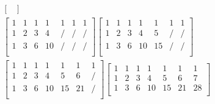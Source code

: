 \begin{gather*}
\begin{bmatrix}
	\end{bmatrix}
	\\
	\begin{bmatrix}
		1 & 1 & 1 & 1  & 1 & 1 & 1 \\
		1 & 2 & 3 & 4  & / & / & / \\
		1 & 3 & 6 & 10 & / & / & / \\
	\end{bmatrix}
	\begin{bmatrix}
		1 & 1 & 1 & 1  & 1  & 1 & 1 \\
		1 & 2 & 3 & 4  & 5  & / & / \\
		1 & 3 & 6 & 10 & 15 & / & / \\
	\end{bmatrix}
	\\
	\begin{bmatrix}
		1 & 1 & 1 & 1  & 1  & 1  & 1 \\
		1 & 2 & 3 & 4  & 5  & 6  & / \\
		1 & 3 & 6 & 10 & 15 & 21 & / \\
	\end{bmatrix}
	\begin{bmatrix}
		1 & 1 & 1 & 1  & 1  & 1  & 1  \\
		1 & 2 & 3 & 4  & 5  & 6  & 7  \\
		1 & 3 & 6 & 10 & 15 & 21 & 28 \\
	\end{bmatrix}
\end{gather*}


